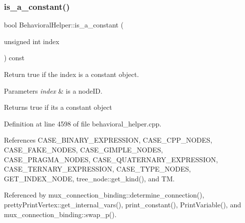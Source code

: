 \subsubsection{\texorpdfstring{is\+\_\+a\+\_\+constant()}{is\_a\_constant()}}
{\footnotesize\ttfamily bool Behavioral\+Helper\+::is\+\_\+a\+\_\+constant (\begin{DoxyParamCaption}\item[{unsigned int}]{index }\end{DoxyParamCaption}) const\hspace{0.3cm}{\ttfamily [virtual]}}



Return true if the index is a constant object. 


\begin{DoxyParams}{Parameters}
{\em index} & is a node\+ID. \\
\hline
\end{DoxyParams}
\begin{DoxyReturn}{Returns}
true if it\textquotesingle{}s a constant object 
\end{DoxyReturn}


Definition at line 4598 of file behavioral\+\_\+helper.\+cpp.



References C\+A\+S\+E\+\_\+\+B\+I\+N\+A\+R\+Y\+\_\+\+E\+X\+P\+R\+E\+S\+S\+I\+ON, C\+A\+S\+E\+\_\+\+C\+P\+P\+\_\+\+N\+O\+D\+ES, C\+A\+S\+E\+\_\+\+F\+A\+K\+E\+\_\+\+N\+O\+D\+ES, C\+A\+S\+E\+\_\+\+G\+I\+M\+P\+L\+E\+\_\+\+N\+O\+D\+ES, C\+A\+S\+E\+\_\+\+P\+R\+A\+G\+M\+A\+\_\+\+N\+O\+D\+ES, C\+A\+S\+E\+\_\+\+Q\+U\+A\+T\+E\+R\+N\+A\+R\+Y\+\_\+\+E\+X\+P\+R\+E\+S\+S\+I\+ON, C\+A\+S\+E\+\_\+\+T\+E\+R\+N\+A\+R\+Y\+\_\+\+E\+X\+P\+R\+E\+S\+S\+I\+ON, C\+A\+S\+E\+\_\+\+T\+Y\+P\+E\+\_\+\+N\+O\+D\+ES, G\+E\+T\+\_\+\+I\+N\+D\+E\+X\+\_\+\+N\+O\+DE, tree\+\_\+node\+::get\+\_\+kind(), and TM.



Referenced by mux\+\_\+connection\+\_\+binding\+::determine\+\_\+connection(), pretty\+Print\+Vertex\+::get\+\_\+internal\+\_\+vars(), print\+\_\+constant(), Print\+Variable(), and mux\+\_\+connection\+\_\+binding\+::swap\+\_\+p().

